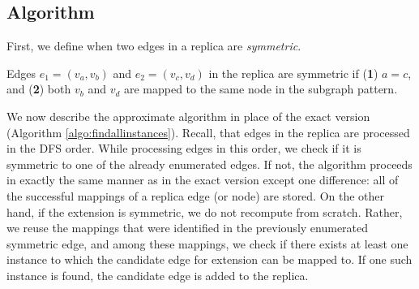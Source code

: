 \subsection{Algorithm}
\label{sec:approxalgo}
First, we define when two edges in a replica are \emph{symmetric}.
\begin{defn}
Edges $e_1=(v_a,v_b)$ and $e_2=(v_c,v_d)$ in the replica are symmetric %
if ({\bf 1}) $a=c$, and  ({\bf 2}) both $v_b$ and $v_d$ are mapped to the same node in the subgraph pattern.%
\end{defn}

We now describe the approximate algorithm in place of the exact version (Algorithm \ref{algo:findallinstances}). Recall, that edges in the replica are processed in the {\sf DFS} order. While processing edges in this order, we check
if it is symmetric to one of the already enumerated edges. If not,
the algorithm proceeds in exactly the same manner as in the exact version except
one difference: all of the successful mappings of a replica edge (or node) are
stored.  On the other hand, if the extension is symmetric, we do
not recompute from scratch. Rather, we reuse the mappings that were identified
in the previously enumerated symmetric edge, and among these mappings, we check
if there exists at least one instance to which the candidate edge for extension
can be mapped to. If one such instance is found, the candidate edge is added to the replica. %

